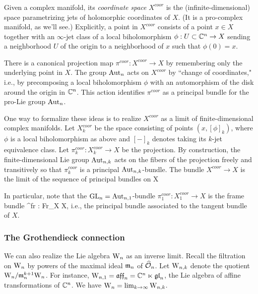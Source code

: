\subsubsection{}

Given a complex manifold, its {\em coordinate space} $X^{coor}$ is the (infinite-dimensional) space parametrizing jets of holomorphic coordinates of $X$. 
(It is a pro-complex manifold, as we'll see.) 
Explicitly, a point in $X^{coor}$ consists of a point $x \in X$ 
together with an $\infty$-jet class of a local biholomorphism $\phi : U \subset \mathbb C^n \to X$ 
sending a neighborhood $U$ of the origin to a neighborhood of $x$ such that $\phi(0) = x$. 

There is a canonical projection map $\pi^{coor} : X^{coor} \to X$ by remembering only the underlying point in $X$. 
The group ${\rm Aut}_n$ acts on $X^{coor}$ by ``change of coordinates," 
i.e., by precomposing a local biholomorphism $\phi$ with an automorphism of the disk around the origin in $\mathbb C^n$.
This action identifies $\pi^{coor}$ as a principal bundle for the pro-Lie group ${\rm Aut}_n$. 

One way to formalize these ideas is to realize $X^{coor}$ as a limit of finite-dimensional complex manifolds. 
Let $X_k^{coor}$ be the space consisting of points $(x, [\phi]_k)$, 
where $\phi$ is a local biholomorphism as above and $[-]_k$ denotes taking its $k$-jet equivalence class. 
Let $\pi_k^{coor} : X^{coor}_k \to X$ be the projection. 
By construction, the finite-dimensional Lie group ${\rm Aut}_{n,k}$ acts on the fibers of the projection freely and transitively 
so that $\pi_k^{coor}$ is a principal ${\rm Aut}_{n,k}$-bundle. The bundle $X^{coor} \to X$ is the limit of the sequence of principal bundles on X
\ben
{}
\een

In particular, note that the ${\rm GL}_n = {\rm Aut}_{n,1}$-bundle $\pi_1^{coor} : X^{coor}_1 \to X$ is the frame bundle
\ben
\pi^{fr} : {\rm Fr}_X \to X,
\een
i.e., the principal bundle associated to the tangent bundle of $X$.

\subsubsection{The Grothendieck connection} 

We can also realize the Lie algebra ${{\rm W}_n}$ as an inverse limit. 
Recall the filtration on ${{\rm W}_n}$ by powers of the maximal ideal ${\mathfrak m}_n$ of $\widehat{\mathcal O}_n$. 
Let ${\rm W}_{n,k}$ denote the quotient ${{\rm W}_n} / {\mathfrak m}_n^{k+1} {{\rm W}_n}$. 
For instance, ${\rm W}_{n,1} = \mathfrak{aff}_n = \mathbb C^n \ltimes {\mathfrak{gl}}_n$, the Lie algebra of affine transformations of $\mathbb C^n$. We have ${{\rm W}_n} = \lim_{k \to \infty} {\rm W}_{n,k}$. 

